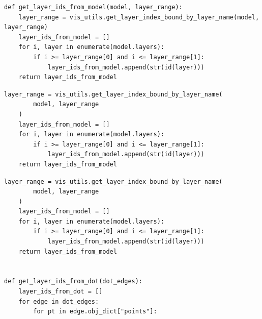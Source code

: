 \begin{lstlisting}[style=conflictcode,title={\textbf{Apertus-8B, with v2.1 in the system prompt} --- edit 0.584, winnowing 0.769, 352 characters}]
def get_layer_ids_from_model(model, layer_range):
    layer_range = vis_utils.get_layer_index_bound_by_layer_name(model, layer_range)
    layer_ids_from_model = []
    for i, layer in enumerate(model.layers):
        if i >= layer_range[0] and i <= layer_range[1]:
            layer_ids_from_model.append(str(id(layer)))
    return layer_ids_from_model
\end{lstlisting}

\begin{lstlisting}[style=conflictcode,title={\textbf{Qwen3-8B, without the skill} --- edit 0.672, winnowing 0.765, 312 characters}]
layer_range = vis_utils.get_layer_index_bound_by_layer_name(
        model, layer_range
    )
    layer_ids_from_model = []
    for i, layer in enumerate(model.layers):
        if i >= layer_range[0] and i <= layer_range[1]:
            layer_ids_from_model.append(str(id(layer)))
    return layer_ids_from_model
\end{lstlisting}

\begin{lstlisting}[style=conflictcode,title={\textbf{Qwen3-8B, with v2.1 in the system prompt} --- edit 0.466, winnowing 0.652, 451 characters}]
layer_range = vis_utils.get_layer_index_bound_by_layer_name(
        model, layer_range
    )
    layer_ids_from_model = []
    for i, layer in enumerate(model.layers):
        if i >= layer_range[0] and i <= layer_range[1]:
            layer_ids_from_model.append(str(id(layer)))
    return layer_ids_from_model


def get_layer_ids_from_dot(dot_edges):
    layer_ids_from_dot = []
    for edge in dot_edges:
        for pt in edge.obj_dict["points"]:
\end{lstlisting}

